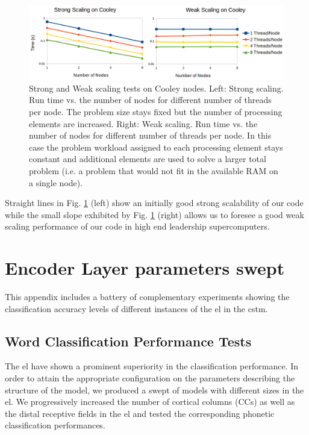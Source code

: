 \documentclass{book}
\begin{document}
\begin{appendices}
\begin{figure}[h!]
    \centering
    \includegraphics[width=1.0\textwidth]{Strong_Weak.png}
    \caption{Strong and Weak scaling tests on Cooley nodes. Left: Strong scaling. Run time vs. the number of nodes for different number of threads per node.
	    The problem size stays fixed but the number of processing elements are increased.
    Right: Weak scaling. Run time vs. the number of nodes for different number of threads per node.
    In this case the problem workload assigned to each processing element stays constant and additional elements are used to solve a larger total problem (i.e. a problem that would not fit in the available RAM on a single node).}
    \label{fig:Strong_Weak}
\end{figure}

Straight lines in Fig. \ref{fig:Strong_Weak} (left) show an initially good strong scalability of our code while the small slope exhibited by Fig. \ref{fig:Strong_Weak} (right) allows us to foresee a good weak scaling performance of our code in high end leadership supercomputers.

\chapter{Encoder Layer parameters swept}
\label{EL_Parameters_Swept}

This appendix includes a battery of complementary experiments showing the classification accuracy levels of different instances of the \gls{el} in the \gls{cstm}.

\section{Word Classification Performance Tests}

The \gls{el} have shown a prominent superiority in the classification performance. In order to attain the appropriate configuration on the parameters describing the structure of the model, we produced a swept of models with different sizes in the \gls{el}. We progressively increased the number of cortical columns (CCs) as well as the distal receptive fields in the \gls{el} and tested the corresponding phonetic classification performances.


\end{appendices}
\end{document}
